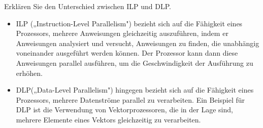 {
    Erklären Sie den Unterschied zwischen ILP und DLP.
}
{
    \begin{itemize}
        \item ILP („Instruction-Level Parallelism") bezieht sich auf die Fähigkeit eines Prozessors,
              mehrere Anweisungen gleichzeitig auszuführen,
              indem er Anweisungen analysiert und versucht,
              Anweisungen zu finden,
              die unabhängig voneinander ausgeführt werden können.
              Der Prozessor kann dann diese Anweisungen parallel ausführen,
              um die Geschwindigkeit der Ausführung zu erhöhen.
        \item DLP(„Data-Level Parallelism") hingegen bezieht sich auf die Fähigkeit eines Prozessors,
              mehrere Datenströme parallel zu verarbeiten.
              Ein Beispiel für DLP ist die Verwendung von Vektorprozessoren,
              die in der Lage sind,
              mehrere Elemente eines Vektors gleichzeitig zu verarbeiten.
    \end{itemize}
}